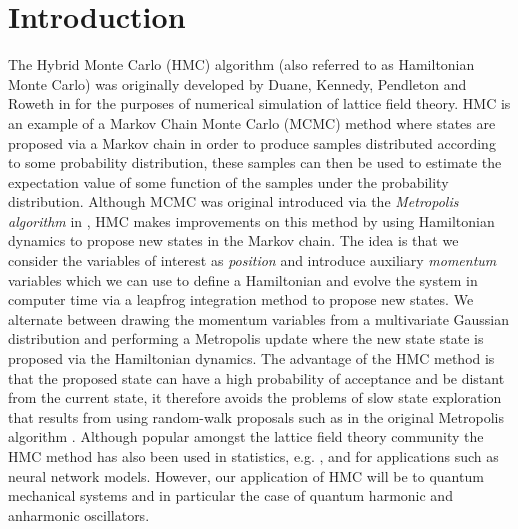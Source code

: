 \documentclass[12pt]{article}
\begin{document}
\section{Introduction}
 The Hybrid Monte Carlo (HMC) algorithm (also referred to as Hamiltonian Monte Carlo) was originally developed by Duane, Kennedy, Pendleton and Roweth in \cite{duane_kennedy_pendleton_roweth_1987} for the purposes of numerical simulation of lattice field theory. HMC is an example of a Markov Chain Monte Carlo (MCMC) method where states are proposed via a Markov chain in order to produce samples distributed according to some probability distribution, these samples can then be used to estimate the expectation value of some function of the samples under the probability distribution. Although MCMC was original introduced via the \textit{Metropolis algorithm} in \cite{metropolis_rosenbluth_rosenbluth_teller_teller_1953}, HMC makes improvements on this method by using Hamiltonian dynamics to propose new states in the Markov chain. The idea is that we consider the variables of interest as \textit{position} and introduce auxiliary \textit{momentum} variables which we can use to define a Hamiltonian and evolve the system in computer time via a leapfrog integration method to propose new states. We alternate between drawing the momentum variables from a multivariate Gaussian distribution and performing a Metropolis update where the new state state is proposed via the Hamiltonian dynamics. The advantage of the HMC method is that the proposed state can have a high probability of acceptance and be distant from the current state, it therefore avoids the problems of slow state exploration that results from using random-walk proposals such as in the original Metropolis algorithm \cite{neal_2011}. Although popular amongst the lattice field theory community the HMC method has also been used in statistics, e.g. \cite{neal_1996_a}, \cite{ishwaran_1999} and \cite{schmidt_2009} for applications such as neural network models. However, our application of HMC will be to quantum mechanical systems and in particular the case of quantum harmonic and anharmonic oscillators.
\end{document}
